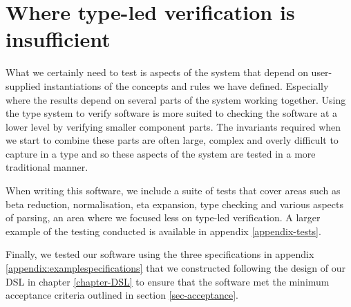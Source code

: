 \section{Where type-led verification is insufficient}

What we certainly need to test is aspects of the system that depend on
user-supplied instantiations of the concepts and rules we have
defined. Especially where the results depend on several parts of the
system working together. Using the type system to verify software is
more suited to checking the software at a lower level by verifying
smaller component parts. The invariants required when we start to
combine these parts are often large, complex and overly difficult to
capture in a type and so these aspects of the system are tested in a
more traditional manner.

When writing this software, we include a suite of tests that cover
areas such as beta reduction, normalisation, eta expansion, type
checking and various aspects of parsing, an area where we
focused less on type-led verification. A larger example of the testing
conducted is available in appendix \ref{appendix-tests}.

Finally, we tested our software using the three specifications in
appendix \ref{appendix:examplespecifications} that we constructed
following the design of our DSL in chapter \ref{chapter-DSL} to ensure
that the software met the minimum acceptance criteria outlined in
section \ref{sec-acceptance}.

